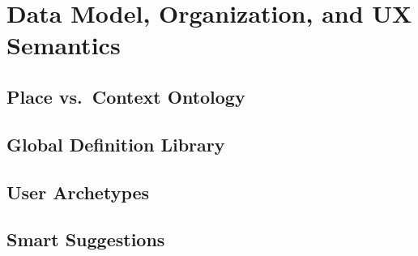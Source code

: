 %

\chapter{Data Model, Organization, and UX Semantics}

\section{Place vs.\ Context Ontology}

\section{Global Definition Library}

\section{User Archetypes}

\section{Smart Suggestions}
